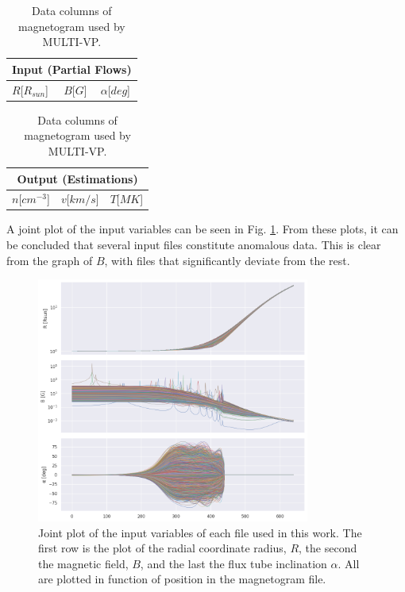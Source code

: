 \begin{table}[ht]
    \caption{Data columns of magnetogram used by MULTI-VP.}
    \label{tab:multivp_columns}
    \begin{subtable}[h]{0.32\textwidth}
        \centering
        \begin{tabular}{lcc}
        \hline
        \multicolumn{3}{c}{Input (Partial Flows)}                              \\ \hline
        $R${[}$R_{sun}${]} & $B${[}$G${]} & $\alpha${[}$deg${]} \\ \hline
        \end{tabular}
    \end{subtable}
    \begin{subtable}[h]{0.32\textwidth}
        \centering
        \begin{tabular}{ccc}
        \hline
        \multicolumn{3}{c}{Output (Estimations)}                           \\ \hline
        $n${[}$cm^{-3}${]} & $v${[}$km/s${]} & $T${[}$MK${]} \\ \hline
        \end{tabular}
    \end{subtable}
\end{table}

A joint plot of the input variables can be seen in Fig. \ref{fig:jointplot_input}. From these plots, it can be concluded that several input files constitute anomalous data. This is clear from the graph of $B$, with files that significantly deviate from the rest. 


\begin{figure}
    \centering
    \includegraphics[width=0.8\textwidth]{figures/joint_input_cols.png}
    \caption{Joint plot of the input variables of each file used in this work. The first row is the plot of the radial coordinate radius, $R$, the second the magnetic field, $B$, and the last the flux tube inclination $\alpha$. All are plotted in function of position in the magnetogram file.}
    \label{fig:jointplot_input}
\end{figure}

